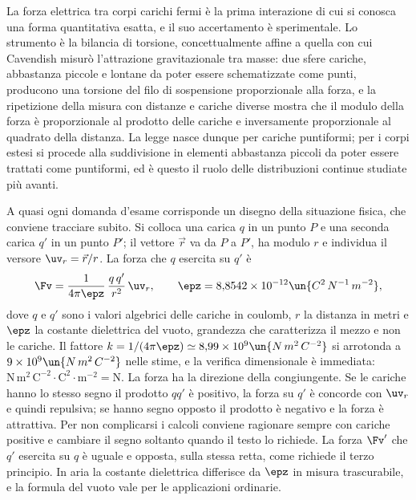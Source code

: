 \documentclass[main.tex]{subfiles}
\begin{document}

La forza elettrica tra corpi carichi fermi è la prima interazione di cui si conosca una forma quantitativa esatta, e il suo accertamento è sperimentale. Lo strumento è la bilancia di torsione, concettualmente affine a quella con cui Cavendish misurò l'attrazione gravitazionale tra masse: due sfere cariche, abbastanza piccole e lontane da poter essere schematizzate come punti, producono una torsione del filo di sospensione proporzionale alla forza, e la ripetizione della misura con distanze e cariche diverse mostra che il modulo della forza è proporzionale al prodotto delle cariche e inversamente proporzionale al quadrato della distanza. La legge nasce dunque per cariche puntiformi; per i corpi estesi si procede alla suddivisione in elementi abbastanza piccoli da poter essere trattati come puntiformi, ed è questo il ruolo delle distribuzioni continue studiate più avanti.

A quasi ogni domanda d'esame corrisponde un disegno della situazione fisica, che conviene tracciare subito. Si colloca una carica $q$ in un punto $P$ e una seconda carica $q'$ in un punto $P'$; il vettore $\vec r$ va da $P$ a $P'$, ha modulo $r$ e individua il versore $\uv_r=\vec r/r$. La forza che $q$ esercita su $q'$ è
\[
\Fv=\frac{1}{4\pi\epz}\,\frac{q\,q'}{r^2}\,\uv_r ,
\qquad
\epz=8{,}8542\times10^{-12}\un{C^2\,N^{-1}\,m^{-2}} ,
\]
dove $q$ e $q'$ sono i valori algebrici delle cariche in coulomb, $r$ la distanza in metri e $\epz$ la costante dielettrica del vuoto, grandezza che caratterizza il mezzo e non le cariche. Il fattore $k=1/(4\pi\epz)\simeq8{,}99\times10^{9}\un{N\,m^2\,C^{-2}}$ si arrotonda a $9\times10^9\un{N\,m^2\,C^{-2}}$ nelle stime, e la verifica dimensionale è immediata: $\mathrm{N\,m^2\,C^{-2}}\cdot\mathrm{C^2}\cdot\mathrm{m^{-2}}=\mathrm{N}$. La forza ha la direzione della congiungente. Se le cariche hanno lo stesso segno il prodotto $qq'$ è positivo, la forza su $q'$ è concorde con $\uv_r$ e quindi repulsiva; se hanno segno opposto il prodotto è negativo e la forza è attrattiva. Per non complicarsi i calcoli conviene ragionare sempre con cariche positive e cambiare il segno soltanto quando il testo lo richiede. La forza $\Fv'$ che $q'$ esercita su $q$ è uguale e opposta, sulla stessa retta, come richiede il terzo principio. In aria la costante dielettrica differisce da $\epz$ in misura trascurabile, e la formula del vuoto vale per le applicazioni ordinarie.
\end{document}
